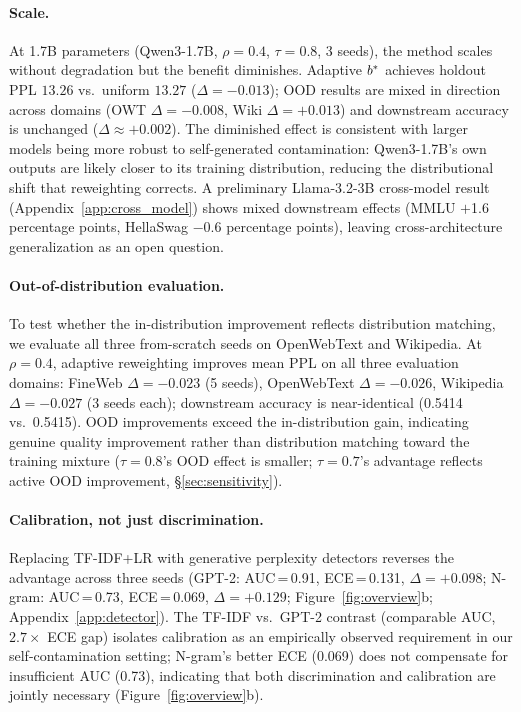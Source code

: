 \paragraph{Scale.}
At 1.7B parameters (Qwen3-1.7B, $\rho{=}0.4$, $\tau{=}0.8$, 3 seeds), the method scales without degradation but the benefit diminishes.
Adaptive $b^*$ achieves holdout PPL $13.26$ vs.\ uniform $13.27$ ($\Delta{=}{-}0.013$); OOD results are mixed in direction across domains (OWT $\Delta{=}{-}0.008$, Wiki $\Delta{=}{+}0.013$) and downstream accuracy is unchanged ($\Delta{\approx}{+}0.002$).
The diminished effect is consistent with larger models being more robust to self-generated contamination: Qwen3-1.7B's own outputs are likely closer to its training distribution, reducing the distributional shift that reweighting corrects.
A preliminary Llama-3.2-3B cross-model result (Appendix~\ref{app:cross_model}) shows mixed downstream effects (MMLU $+$1.6 percentage points, HellaSwag $-$0.6 percentage points), leaving cross-architecture generalization as an open question.
\paragraph{Out-of-distribution evaluation.}
To test whether the in-distribution improvement reflects distribution matching, we evaluate all three from-scratch seeds on OpenWebText and Wikipedia.
At $\rho{=}0.4$, adaptive reweighting improves mean PPL on all three evaluation domains: FineWeb $\Delta{=}{-}0.023$ (5 seeds), OpenWebText $\Delta{=}{-}0.026$, Wikipedia $\Delta{=}{-}0.027$ (3 seeds each); downstream accuracy is near-identical (0.5414 vs.\ 0.5415).
OOD improvements exceed the in-distribution gain, indicating genuine quality improvement rather than distribution matching toward the training mixture ($\tau{=}0.8$'s OOD effect is smaller; $\tau{=}0.7$'s advantage reflects active OOD improvement, \S\ref{sec:sensitivity}).

\paragraph{Calibration, not just discrimination.}
Replacing TF-IDF+LR with generative perplexity detectors reverses the advantage across three seeds (GPT-2: AUC\,=\,0.91, ECE\,=\,0.131, $\Delta{=}{+}0.098$; N-gram: AUC\,=\,0.73, ECE\,=\,0.069, $\Delta{=}{+}0.129$; Figure~\ref{fig:overview}b; Appendix~\ref{app:detector}).
The TF-IDF vs.\ GPT-2 contrast (comparable AUC, $2.7{\times}$ ECE gap) isolates calibration as an empirically observed requirement in our self-contamination setting; N-gram's better ECE (0.069) does not compensate for insufficient AUC (0.73), indicating that both discrimination and calibration are jointly necessary (Figure~\ref{fig:overview}b).

